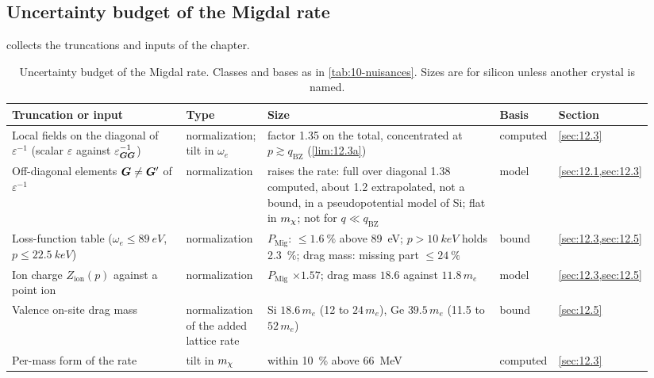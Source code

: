 \subsection{Uncertainty budget of the Migdal rate}\label{sec:12.6-table}

 collects the truncations and inputs of the chapter.

\begin{table}[tbp]
  \caption{Uncertainty budget of the Migdal rate. Classes and bases as in \cref{tab:10-nuisances}. Sizes are for silicon unless another crystal is named.}
  \label{tab:12-nuisances}
  \centering\footnotesize\setlength{\tabcolsep}{3pt}
  \begin{tabular}{@{}>{\raggedright\arraybackslash}p{0.27\linewidth}>{\raggedright\arraybackslash}p{0.12\linewidth}>{\raggedright\arraybackslash}p{0.36\linewidth}>{\raggedright\arraybackslash}p{0.09\linewidth}>{\raggedright\arraybackslash}p{0.10\linewidth}@{}}
    \toprule
    Truncation or input & Type & Size & Basis & Section \\
    \midrule
    Local fields on the diagonal of $\varepsilon^{-1}$ (scalar $\varepsilon$ against $\varepsilon^{-1}_{\bm{G}\bm{G}}$) & normali\-zation; tilt in $\omega_e$ & factor 1.35 on the total, concentrated at $p \gtrsim q_{\mathrm{BZ}}$ (\cref{lim:12.3a}) & computed & \cref{sec:12.3} \\
    Off-diagonal elements $\bm{G} \neq \bm{G}'$ of $\varepsilon^{-1}$ & normali\-zation & raises the rate: full over diagonal 1.38 computed, about 1.2 extrapolated, not a bound, in a pseudopotential model of Si; flat in $m_{\chi}$; not for $q \ll q_{\mathrm{BZ}}$ & model & \cref{sec:12.1,sec:12.3} \\
    Loss-function table ($\omega_e \le \SI{89}{eV}$, $p \le \SI{22.5}{keV}$) & normali\-zation & $P_{\mathrm{Mig}}$: $\le\SI{1.6}{\percent}$ above \SI{89}{eV}; $p > \SI{10}{keV}$ holds \SI{2.3}{\percent}; drag mass: missing part $\le\SI{24}{\percent}$ & bound & \cref{sec:12.3,sec:12.5} \\
    Ion charge $Z_{\mathrm{ion}}(p)$ against a point ion & normali\-zation & $P_{\mathrm{Mig}}$ $\times1.57$; drag mass $18.6$ against $11.8\,m_e$ & model & \cref{sec:12.3,sec:12.5} \\
    Valence on-site drag mass & normali\-zation of the added lattice rate & Si $18.6\,m_e$ (12 to $24\,m_e$), Ge $39.5\,m_e$ (11.5 to $52\,m_e$) & bound & \cref{sec:12.5} \\
    Per-mass form of the rate & tilt in $m_{\chi}$ & within \SI{10}{\percent} above \SI{66}{MeV} & computed & \cref{sec:12.3} \\

\end{tabular}
\end{table}
